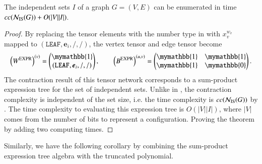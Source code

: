 \documentclass[review, onefignum, onetabnum]{siamart190516}
\begin{document}
\begin{theorem}\label{thm:complexexpr}
        The independent sets $I$ of a graph $G=(V,E)$ can be enumerated in time $cc({\mathcal{N}_{\rm IS}(G)}) + O(|V||I|)$.
\end{theorem}
\begin{proof}
By replacing the tensor elements with the number type in  with $x_v^{w_v}$ mapped to $(\texttt{LEAF},\boldsymbol{e}_i,/,/)$, the vertex tensor and edge tensor become
\begin{equation}
    \left(W^{\rm EXPR}\right)^{(v)} = \left(\begin{matrix}
        \mymathbb{1} \\
        (\texttt{LEAF},\boldsymbol{e}_i,/,/)
    \end{matrix}\right),   
    \qquad
        \left(B^{\rm EXPR}\right)^{(u, v)} = \left(\begin{matrix}
        \mymathbb{1}  & \mymathbb{1} \\
        \mymathbb{1} & \mymathbb{0}
    \end{matrix}\right).
\end{equation}
The contraction result of this tensor network corresponds to a sum-product expression tree for the set of independent sets.
Unlike in , the contraction complexity is independent of the set size, i.e. the time complexity is $cc({\mathcal{N}_{\rm IS}(G)})$ by .
The time complexity to evaluating this expression tree is $O(|V||I|)$, where $|V|$ comes from the number of bits to represent a configuration.
Proving the theorem by adding two computing times.
\end{proof}

Similarly, we have the following corollary by combining the sum-product expression tree algebra with the truncated polynomial.
\end{document}
